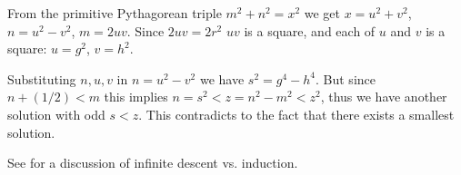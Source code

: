 \documentclass[12pt]{article}
\begin{document}
From the primitive Pythagorean triple $m^2+n^2=x^2$ we get $x=u^2 +v^2$, $n=u^2 -v^2$, $m=2uv$. Since $2uv=2r^2$ $uv$ is a square, and each of $u$ and $v$ is a square: $u=g^2$, $v=h^2$. 

Substituting $n,u, v$ in $n=u^2 -v^2$ we have $s^2 =g^4-h^4$. 
But since $n+(1/2) <m$ this implies $n=s^2 <z=n^2-m^2 <z^2$, thus we have another solution with odd $s<z$. This contradicts to the fact that there exists a smallest solution.

See  for a discussion of 
infinite descent vs. induction.
\end{document}
